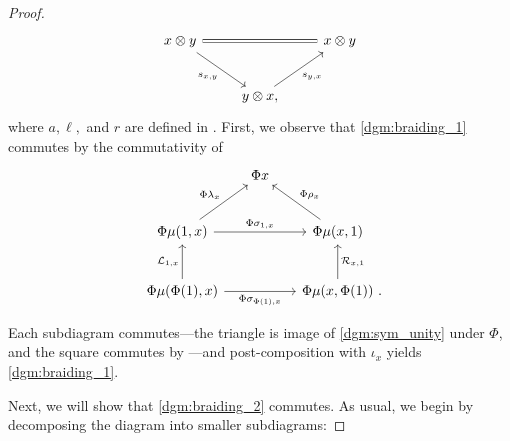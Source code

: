 \documentclass[openany, amssymb, psamsfonts]{amsart}
\theoremstyle{definition}
\numberwithin{equation}{section}
\begin{document}
\begin{proof}
\begin{equation} \label{dgm:braiding_3}
    \begin{tikzcd}[row sep = 2.5em]
        x \otimes y \ar[dr, "{s_{x, y}}"'] \ar[rr, equals] && x \otimes y\\
        & y \otimes x, \ar[ur, "{s_{y, x}}"']
    \end{tikzcd}
\end{equation} where $a, \ell, $ and $r$ are defined in . First, we observe that \eqref{dgm:braiding_1} commutes by the commutativity of
\begin{equation*}
    \begin{tikzcd}[row sep = 2.5em, column sep = 1.5em]
        & \Phi x \\
        \Phi \mu(1, x) \ar[ur, "{\Phi \lambda_x}"] \ar[rr, "{\Phi \sigma_{1, x}}"] && \Phi \mu(x, 1) \ar[ul, "{\Phi \rho_x}"']\\
        \Phi \mu(\Phi (1), x) \ar[u, "{\calL_{1, x}}"] \ar[rr, "{\Phi \sigma_{\Phi(1), x}}"'] && \Phi \mu(x, \Phi(1)) \period \ar[u, "{\calR_{x, 1}}"']
    \end{tikzcd}
\end{equation*}
 
\noindent Each subdiagram commutes---the triangle is image of \eqref{dgm:sym_unity} under $\Phi$, and the square commutes by ---and post-composition with $\iota_x$ yields \eqref{dgm:braiding_1}.

Next, we will show that \eqref{dgm:braiding_2} commutes. As usual, we begin by decomposing the diagram into smaller subdiagrams:



\end{proof}
\end{document}
